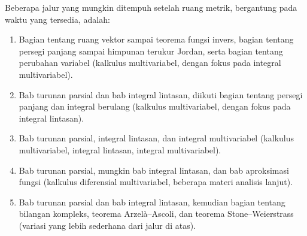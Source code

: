 Beberapa jalur yang mungkin ditempuh setelah ruang metrik, bergantung pada
waktu yang tersedia, adalah:
\begin{enumerate}[1)]
\item
Bagian tentang ruang vektor sampai teorema fungsi invers,
bagian tentang persegi panjang sampai himpunan terukur Jordan, serta
bagian tentang perubahan variabel
(kalkulus multivariabel, dengan fokus pada integral multivariabel).
\item
Bab turunan parsial dan bab integral lintasan,
diikuti bagian tentang persegi panjang dan integral berulang
(kalkulus multivariabel, dengan fokus pada integral lintasan).
\item Bab turunan parsial, integral lintasan, dan integral multivariabel
(kalkulus multivariabel, integral lintasan, integral multivariabel).
\item
Bab turunan parsial, mungkin bab integral lintasan, dan bab aproksimasi fungsi
(kalkulus diferensial multivariabel, beberapa materi analisis lanjut).
\item
Bab turunan parsial dan bab integral lintasan, kemudian bagian tentang
bilangan kompleks, teorema Arzelà--Ascoli, dan teorema Stone--Weierstrass
(variasi yang lebih sederhana dari jalur di atas).
\end{enumerate}

